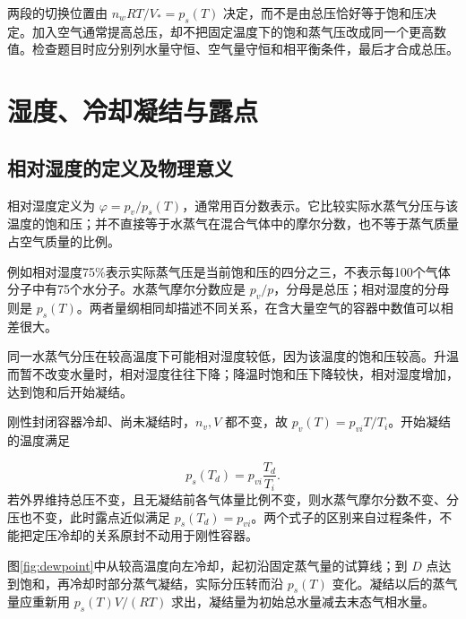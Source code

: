 两段的切换位置由 $n_wRT/V_*=p_s(T)$ 决定，而不是由总压恰好等于饱和压决定。加入空气通常提高总压，却不把固定温度下的饱和蒸气压改成同一个更高数值。检查题目时应分别列水量守恒、空气量守恒和相平衡条件，最后才合成总压。


\section{湿度、冷却凝结与露点}
\subsection{相对湿度的定义及物理意义}
相对湿度定义为 $\varphi=p_v/p_s(T)$，通常用百分数表示。它比较实际水蒸气分压与该温度的饱和压；并不直接等于水蒸气在混合气体中的摩尔分数，也不等于蒸气质量占空气质量的比例。

例如相对湿度75\%表示实际蒸气压是当前饱和压的四分之三，不表示每100个气体分子中有75个水分子。水蒸气摩尔分数应是 $p_v/p$，分母是总压；相对湿度的分母则是 $p_s(T)$。两者量纲相同却描述不同关系，在含大量空气的容器中数值可以相差很大。

同一水蒸气分压在较高温度下可能相对湿度较低，因为该温度的饱和压较高。升温而暂不改变水量时，相对湿度往往下降；降温时饱和压下降较快，相对湿度增加，达到饱和后开始凝结。


刚性封闭容器冷却、尚未凝结时，$n_v,V$ 都不变，故 $p_v(T)=p_{vi}T/T_i$。开始凝结的温度满足

\[p_s(T_d)=p_{vi}\frac{T_d}{T_i}.
\]
若外界维持总压不变，且无凝结前各气体量比例不变，则水蒸气摩尔分数不变、分压也不变，此时露点近似满足 $p_s(T_d)=p_{vi}$。两个式子的区别来自过程条件，不能把定压冷却的关系原封不动用于刚性容器。


图\ref{fig:dewpoint}中从较高温度向左冷却，起初沿固定蒸气量的试算线；到 $D$ 点达到饱和，再冷却时部分蒸气凝结，实际分压转而沿 $p_s(T)$ 变化。凝结以后的蒸气量应重新用 $p_s(T)V/(RT)$ 求出，凝结量为初始总水量减去末态气相水量。

